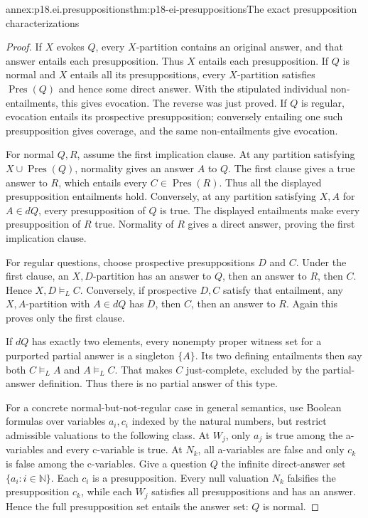 \begin{annexitem}{annex:p18.ei.presuppositions}{thm:p18-ei-presuppositions}{The exact presupposition characterizations}
\begin{proof}
If \(X\) evokes \(Q\), every \(X\)-partition contains an original
answer, and that answer entails each presupposition. Thus \(X\) entails
each presupposition. If \(Q\) is normal and \(X\) entails all its
presuppositions, every \(X\)-partition satisfies \(\operatorname{Pres}(Q)\)
and hence some direct answer. With the stipulated individual non-entailments,
this gives evocation. The reverse was just proved. If \(Q\) is regular,
evocation entails its prospective presupposition; conversely entailing one
such presupposition gives coverage, and the same non-entailments give evocation.

For normal \(Q,R\), assume the first implication clause. At any partition
satisfying \(X\cup\operatorname{Pres}(Q)\), normality gives an answer
\(A\) to \(Q\). The first clause gives a true answer to \(R\), which
entails every \(C\in\operatorname{Pres}(R)\). Thus all the displayed
presupposition entailments hold. Conversely, at any partition satisfying
\(X,A\) for \(A\in dQ\), every presupposition of \(Q\) is true. The
displayed entailments make every presupposition of \(R\) true. Normality
of \(R\) gives a direct answer, proving the first implication clause.

For regular questions, choose prospective presuppositions \(D\) and \(C\).
Under the first clause, an \(X,D\)-partition has an answer to \(Q\), then
an answer to \(R\), then \(C\). Hence \(X,D\models_L C\). Conversely,
if prospective \(D,C\) satisfy that entailment, any \(X,A\)-partition
with \(A\in dQ\) has \(D\), then \(C\), then an answer to \(R\).
Again this proves only the first clause.

If \(dQ\) has exactly two elements, every nonempty proper witness set
for a purported partial answer is a singleton \(\{A\}\). Its two
defining entailments then say both \(C\models_L A\) and
\(A\models_L C\). That makes \(C\) just-complete, excluded by the
partial-answer definition. Thus there is no partial answer of this type.

For a concrete normal-but-not-regular case in general semantics, use Boolean
formulas over variables \(a_i,c_i\) indexed by the natural numbers, but
restrict admissible valuations to the following class. At \(W_j\), only
\(a_j\) is true among the a-variables and every c-variable is true. At
\(N_k\), all a-variables are false and only \(c_k\) is false among the
c-variables. Give a question \(Q\) the infinite direct-answer set
\(\{a_i:i\in\mathbb N\}\). Each \(c_i\) is a presupposition. Every
null valuation \(N_k\) falsifies the presupposition \(c_k\), while each
\(W_j\) satisfies all presuppositions and has an answer. Hence the full
presupposition set entails the answer set: \(Q\) is normal.


\end{proof}
\end{annexitem}
